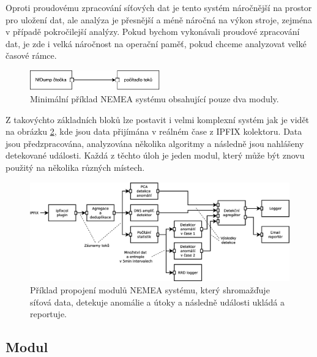 Oproti proudovému zpracování síťových dat je tento systém náročnější na prostor pro uložení dat, ale analýza je přesnější a méně náročná na výkon stroje, zejména v případě pokročilejší analýzy. Pokud bychom vykonávali proudové zpracování dat, je zde i velká náročnost na operační paměť, pokud chceme analyzovat velké časové rámce.

\begin{figure}[h]
    \centering
    \includegraphics[width=0.5\textwidth]{fig/nemea-basic.pdf}
    \caption{Minimální příklad NEMEA systému obsahující pouze dva moduly.} \label{fig:nemea-schema}
  
\end{figure}

Z takovýchto základních bloků lze postavit i velmi komplexní systém jak je vidět na obrázku \ref{fig:nemea-example-2}, kde jsou data přijímána v reálném čase z IPFIX\cite{ipfix} kolektoru. Data jsou předzpracována, analyzována několika algoritmy a následně jsou nahlášeny detekované události. Každá z těchto úloh je jeden modul, který může být znovu použitý na několika různých místech.

\begin{figure}[h]
    \centering
    \includegraphics[width=1\textwidth]{fig/nemea-example-2-cz.eps}
    \caption{Příklad propojení modulů NEMEA systému, který shromažďuje síťová data, detekuje anomálie a útoky a následně události ukládá a reportuje.} \label{fig:nemea-example-2}
  
\end{figure}



\subsection{Modul}

